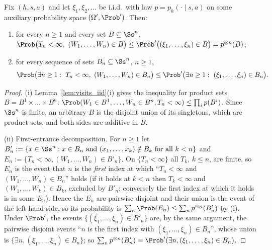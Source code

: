 \begin{lemma}\label{lem:empirical_visits_domination}
\leanok
{}
Fix $(h, s, a)$ and let $\xi_1, \xi_2, \dots$ be i.i.d.\ with law $p = p_h(\cdot \mid s, a)$ on some
auxiliary probability space $(\Omega', \Prob')$. Then:
\begin{enumerate}
  \item[(i)] for every $n \ge 1$ and every set $B \subseteq \Ss^n$,
        $\Prob\big(T_n < \infty,\ (W_1, \dots, W_n) \in B\big) \le \Prob'\big((\xi_1, \dots, \xi_n) \in B\big) = p^{\otimes n}(B)$;
  \item[(ii)] for every sequence of sets $B_n \subseteq \Ss^n$, $n \ge 1$,
        \[
          \Prob\big(\exists n \ge 1 :\ T_n < \infty,\ (W_1, \dots, W_n) \in B_n\big)
          \le \Prob'\big(\exists n \ge 1 :\ (\xi_1, \dots, \xi_n) \in B_n\big) .
        \]
\end{enumerate}
\end{lemma}

\begin{proof}
\leanok
(i) Lemma~\ref{lem:visits_iid}(i) gives the inequality for product sets
$B = B^1 \times \dots \times B^n$: $\Prob(W_1 \in B^1, \dots, W_n \in B^n, T_n < \infty) \le \prod_i p(B^i)$.
Since $\Ss^n$ is finite, an arbitrary $B$ is the disjoint union of its singletons, which are
product sets, and both sides are additive in $B$.

(ii) First-entrance decomposition. For $n \ge 1$ let
$B'_n := \{x \in \Ss^n : x \in B_n \text{ and } (x_1, \dots, x_k) \notin B_k \text{ for all } k < n\}$
and $E_n := \{T_n < \infty, (W_1, \dots, W_n) \in B'_n\}$. On $\{T_n < \infty\}$ all $T_k$, $k \le n$,
are finite, so $E_n$ is the event that $n$ is the \emph{first} index at which
``$T_n < \infty$ and $(W_1, \dots, W_n) \in B_n$'' holds (if it holds at $k < n$ then $T_k < \infty$
and $(W_1, \dots, W_k) \in B_k$, excluded by $B'_n$; conversely the first index at which it holds
is in some $E_n$). Hence the $E_n$ are pairwise disjoint and their union is the event of the
left-hand side, so its probability is $\sum_n \Prob(E_n) \le \sum_n p^{\otimes n}(B'_n)$ by (i).
Under $\Prob'$, the events $\{(\xi_1, \dots, \xi_n) \in B'_n\}$ are, by the same argument, the
pairwise disjoint events ``$n$ is the first index with $(\xi_1, \dots, \xi_n) \in B_n$'', whose
union is $\{\exists n, (\xi_1, \dots, \xi_n) \in B_n\}$; so
$\sum_n p^{\otimes n}(B'_n) = \Prob'(\exists n, (\xi_1, \dots, \xi_n) \in B_n)$.
\end{proof}

